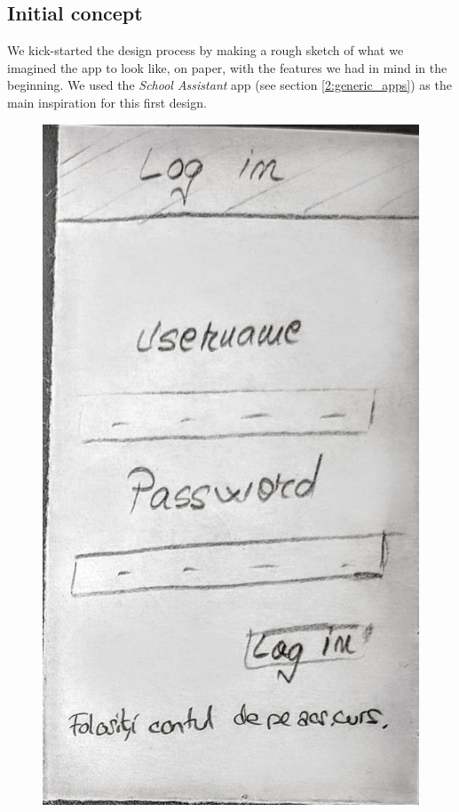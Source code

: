 \subsection{Initial concept} \label{4:paper_concept}

We kick-started the design process by making a rough sketch of what we imagined the app to look like, on paper, with the features we had in mind in the beginning. We used the \textit{School Assistant} app (see section \ref{2:generic_apps}) as the main inspiration for this first design.

\begin{figure}[ht]
    \centering
         \includegraphics[height=0.279\textheight]{figures/app/paper/login.jpg}

\end{figure}
